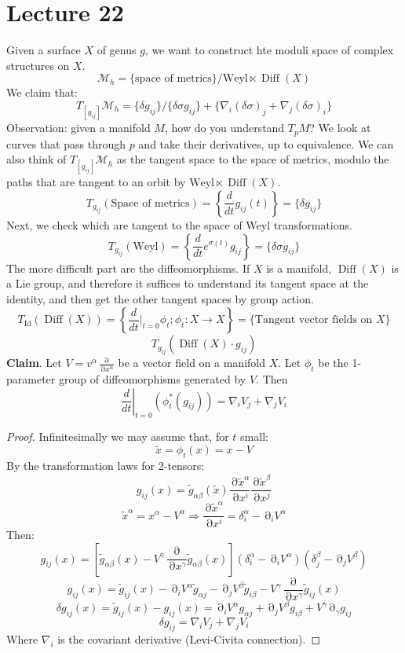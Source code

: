 \documentclass[12 pt]{article}
\DeclareMathOperator {\p} {\partial}
\DeclareMathOperator {\Diff}{Diff}
\DeclareMathOperator {\id}{Id}
\theoremstyle{plain}
\theoremstyle{definition}
\theoremstyle{remark}
\begin{document}
\section*{Lecture 22}
Given a surface $X$ of genus $g$, we want to construct hte moduli space of complex structures on $X$.
\[   \mathcal{M}_h = \{ \text{space of metrics} \} / \text{Weyl} \ltimes \Diff (X)    \]
We claim that:
\[      T_{[g_{ij}]} \mathcal{M}_h = \{ \delta g_{ij} \} / \{ \delta \sigma g_{ij} \} + \{ \nabla_i (\delta \sigma)_j + \nabla_j (\delta \sigma)_i \}    \]
Observation: given a manifold $M$, how do you understand $T_p M$? We look at curves that pass through $p$ and take their derivatives, up to equivalence. We can also think of $T_{[g_{ij}]} \mathcal{M}_h$ as the tangent space to the space of metrics, modulo the paths that are tangent to an orbit by $\text{Weyl} \ltimes \Diff (X)$.
\[     T_{g_{ij}} ( \text{Space of metrics}) = \left\{ \frac{d}{dt} g_{ij}(t)  \right\}  = \{ \delta g_{ij} \}    \]
Next, we check which are tangent to the space of Weyl transformations. 
\[      T_{g_{ij}} ( \text{Weyl})  =   \left\{ \frac{d}{dt} e^{\sigma(t)} g_{ij}  \right\}  = \{ \delta \sigma g_{ij} \}     \]
The more difficult part are the diffeomorphisms. If $X$ is a manifold, $\Diff (X)$ is a Lie group, and therefore it suffices to understand its tangent space at the identity, and then get the other tangent spaces by group action.
\[      T_{\id} (\Diff(X)) = \left\{  \frac{d}{dt}|_{t=0} \phi_t ; \phi_t : X \to X \right\}  = \{ \text{Tangent vector fields on }X \}    \]
\[        T_{g_{ij}} (\Diff(X) \cdot g_{ij} )        \]
\textbf{Claim}. Let $V = v^{\alpha} \frac{\p}{\p x^{\alpha}}$ be a vector field on a manifold $X$. Let $\phi_t$ be the 1-parameter group of diffeomorphisms generated by $V$. Then
\[      \left.  \frac{d}{dt} \right|_{t=0}  (\phi_t^* (g_{ij})) = \nabla_i V_j + \nabla_j V_i    \]
\begin{proof}
Infinitesimally we may assume that, for $t$ small:
\[      \tilde x = \phi_t(x) = x - V     \]
By the transformation laws for 2-tensors:
\[       g_{ij} (x) = \tilde g_{\alpha \beta} (\tilde x)  \frac{\p \tilde x^{\alpha}}{\p x^i}  \frac{\p \tilde x^{\beta}}{\p x^j}  \]
\[     \tilde x^{\alpha} = x^{\alpha} - V^{\alpha} \Longrightarrow \frac{\p \tilde x^{\alpha}}{\p x^i} = \delta^{\alpha}_i - \p_i V^{\alpha}     \]
Then:
\[        g_{ij} (x) = \left[ \tilde g_{\alpha \beta}(x) - V^{\gamma} \frac{\p}{\p x^{\gamma}} \tilde g_{\alpha \beta}(x) \right] (\delta^{\alpha}_i - \p_i V^{\alpha})(\delta^{\beta}_j - \p_j V^{\beta})     \]
\[       g_{ij} (x) = \tilde g_{ij}(x) - \p_i V^{\alpha} \tilde g_{\alpha j} - \p_j V^{\beta} \tilde g_{i \beta}  - V^{\gamma} \frac{\p}{\p x^{\gamma}} \tilde g_{ij} (x)       \]
\[     \delta g_{ij} (x) = \tilde g_{ij}(x) - g_{ij}(x) = \p_i V^{\alpha} g_{\alpha j} + \p_j V^{\beta} g_{i\beta} + V^{\gamma} \p_{\gamma} g_{ij}      \]
\[      \delta g_{ij} = \nabla_i V_j + \nabla_j V_i      \]
Where $\nabla_i$ is the covariant derivative (Levi-Civita connection).
\end{proof}
\end{document}
